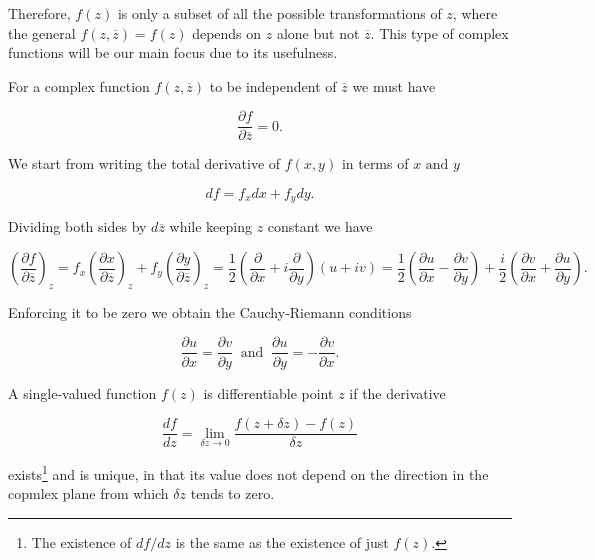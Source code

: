 \documentclass[english,a4paper,12pt]{report}
\begin{document}
Therefore, \(f(z)\) is only a subset of all the possible transformations of \(z\), where the general \(f(z,\overline{z} ) = f(z)\) depends on \(z\) alone but not \(\overline{z} \). This type of complex functions will be our main focus due to its usefulness.

For a complex function \(f(z,\overline{z} )\) to be independent of \(\overline{z} \) we must have 

\begin{equation}
    \frac{\partial f}{\partial \overline{z} } = 0. 
\end{equation}

We start from writing the total derivative of \(f(x,y)\) in terms of \(x \text { and } y\)

\begin{equation}
    df = f_{x}  dx + f_{y}  dy.
\end{equation}

Dividing both sides by \(d \overline{z} \) while keeping \(z\) constant we have 

\begin{equation}
    \left( \frac{\partial f}{\partial \overline{z} } \right)_{z} = f_{x} \left( \frac{\partial x}{\partial \overline{z} } \right)_{z} + f_{y} \left( \frac{\partial y}{\partial \overline{z} } \right)_{z} = \frac{1}{2} \left( \frac{\partial }{\partial x} + i \frac{\partial }{\partial y}  \right) (u+iv) = \frac{1}{2} \left( \frac{\partial u}{\partial x} -\frac{\partial v}{\partial y}  \right) + \frac{i}{2} \left( \frac{\partial v}{\partial x} + \frac{\partial u}{\partial y}  \right).
\end{equation}

Enforcing it to be zero we obtain the Cauchy-Riemann conditions

\begin{equation}
    \frac{\partial u}{\partial x} = \frac{\partial v}{\partial y} ~\text { and }~ \frac{\partial u}{\partial y} = -\frac{\partial v}{\partial x}.
\end{equation}

A single-valued function \(f(z)\) is differentiable point \(z\) if the derivative 

\begin{equation}
    \frac{df}{dz} = \lim_{\delta z \to 0} \frac{f(z+\delta z)-f(z)}{\delta z}   
\end{equation}

exists\footnote{The existence of \(df/dz\) is the same as the existence of just \(f(z)\).} and is unique, in that its value does not depend on the direction in the copmlex plane from which \(\delta z\) tends to zero. 
\end{document}
